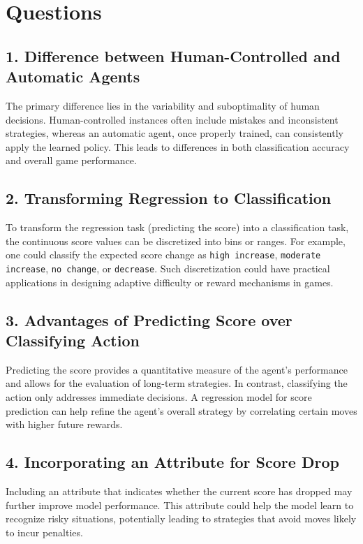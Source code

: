 \documentclass[12pt,a4paper]{article}
\begin{document}
\section{Questions}
\subsection*{1. Difference between Human-Controlled and Automatic Agents}
The primary difference lies in the variability and suboptimality of human decisions. Human-controlled instances often include mistakes and inconsistent strategies, whereas an automatic agent, once properly trained, can consistently apply the learned policy. This leads to differences in both classification accuracy and overall game performance.

\subsection*{2. Transforming Regression to Classification}
To transform the regression task (predicting the score) into a classification task, the continuous score values can be discretized into bins or ranges. For example, one could classify the expected score change as \texttt{high increase}, \texttt{moderate increase}, \texttt{no change}, or \texttt{decrease}. Such discretization could have practical applications in designing adaptive difficulty or reward mechanisms in games.

\subsection*{3. Advantages of Predicting Score over Classifying Action}
Predicting the score provides a quantitative measure of the agent’s performance and allows for the evaluation of long-term strategies. In contrast, classifying the action only addresses immediate decisions. A regression model for score prediction can help refine the agent’s overall strategy by correlating certain moves with higher future rewards.

\subsection*{4. Incorporating an Attribute for Score Drop}
Including an attribute that indicates whether the current score has dropped may further improve model performance. This attribute could help the model learn to recognize risky situations, potentially leading to strategies that avoid moves likely to incur penalties.
\end{document}
